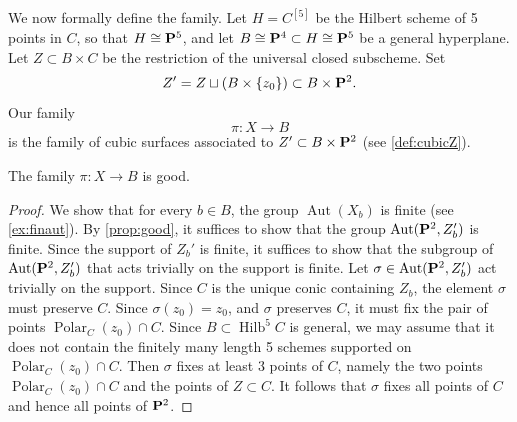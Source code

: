 \documentclass[reqno]{amsart}
\DeclareMathOperator{\Polar}{Polar}
\DeclareMathOperator{\Hilb}{Hilb}
\renewcommand{\to}{{\longrightarrow}}
\renewcommand {\P}{{\bf P}}
\providecommand{\Aut}{\operatorname{Aut}}
\numberwithin{equation}{section}
\begin{document}
We now formally define the family.
Let $H = C^{[5]}$ be the Hilbert scheme of 5 points in $C$, so that $H \cong \P^5$, and let $B \cong \P^4 \subset H \cong \P^5$ be a general hyperplane.
Let $Z \subset B \times C$ be the restriction of the universal closed subscheme.
Set
\[Z' = Z \sqcup \left(B \times \{z_0\}\right) \subset B \times \P^2.\]
Our family
\[\pi \colon X \to B\]
is the family of cubic surfaces associated to $Z' \subset B \times \P^2$ (see \autoref{def:cubicZ}).
\begin{proposition}\label{prop:goodnessB1}
  The family $\pi \colon X \to B$ is good.
\end{proposition}
\begin{proof}
  We show that for every $b \in B$, the group $\Aut(X_b)$ is finite (see \autoref{ex:finaut}).
  By \autoref{prop:good}, it suffices to show that the group $\Aut(\P^2, Z_b')$ is finite.
  Since the support of $Z_b'$ is finite, it suffices to show that the subgroup of $\Aut(\P^2, Z'_b)$ that acts trivially on the support is finite.
  Let $\sigma \in \Aut(\P^2, Z'_b)$ act trivially on the support.
  Since $C$ is the unique conic containing $Z_b$, the element $\sigma$ must preserve $C$.
  Since $\sigma(z_0) = z_0$, and $\sigma$ preserves $C$, it must fix the pair of points $\Polar_C(z_0) \cap C$.
  Since $B \subset \Hilb^5C$ is general, we may assume that it does not contain the finitely many length 5 schemes supported on $\Polar_C(z_0) \cap C$.
  Then $\sigma$ fixes at least 3 points of $C$, namely the two points $\Polar_C(z_0) \cap C$ and the points of $Z \subset C$.
  It follows that $\sigma$ fixes all points of $C$ and hence all points of $\P^2$.
\end{proof}
\end{document}
